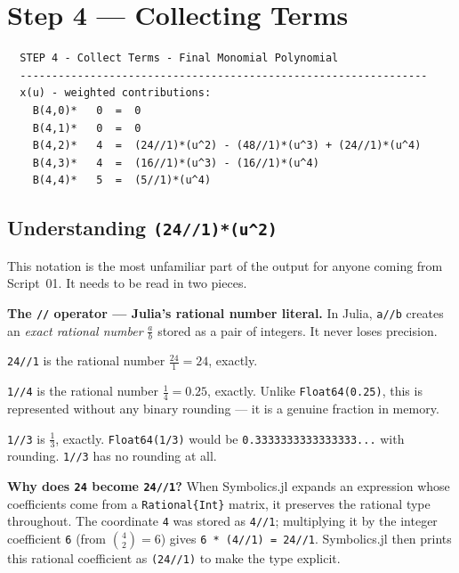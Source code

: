 \documentclass[12pt, a4paper]{article}
\newcommand{\cd}[1]{\texttt{#1}}
\begin{document}
\section{Step 4 --- Collecting Terms}

\begin{verbatim}
  STEP 4 - Collect Terms - Final Monomial Polynomial
  ----------------------------------------------------------------
  x(u) - weighted contributions:
    B(4,0)*   0  =  0
    B(4,1)*   0  =  0
    B(4,2)*   4  =  (24//1)*(u^2) - (48//1)*(u^3) + (24//1)*(u^4)
    B(4,3)*   4  =  (16//1)*(u^3) - (16//1)*(u^4)
    B(4,4)*   5  =  (5//1)*(u^4)
\end{verbatim}

\subsection{Understanding \texttt{(24//1)*(u\^{}2)}}

This notation is the most unfamiliar part of the output
for anyone coming from Script~01.
It needs to be read in two pieces.

\textbf{The \cd{//} operator --- Julia's rational number literal.}
In Julia, \cd{a//b} creates an \emph{exact rational number}
$\frac{a}{b}$ stored as a pair of integers.
It never loses precision.

\begin{examplebox}
\cd{24//1} is the rational number $\frac{24}{1} = 24$, exactly.

\cd{1//4} is the rational number $\frac{1}{4} = 0.25$, exactly.
Unlike \cd{Float64(0.25)}, this is represented without any binary
rounding --- it is a genuine fraction in memory.

\cd{1//3} is $\frac{1}{3}$, exactly.
\cd{Float64(1/3)} would be \cd{0.3333333333333333...} with rounding.
\cd{1//3} has no rounding at all.
\end{examplebox}

\textbf{Why does \cd{24} become \cd{24//1}?}
When Symbolics.jl expands an expression whose coefficients
come from a \cd{Rational\{Int\}} matrix, it preserves the
rational type throughout.
The coordinate \cd{4} was stored as \cd{4//1};
multiplying it by the integer coefficient \cd{6}
(from $\binom{4}{2} = 6$) gives \cd{6 * (4//1) = 24//1}.
Symbolics.jl then prints this rational coefficient
as \cd{(24//1)} to make the type explicit.
\end{document}
